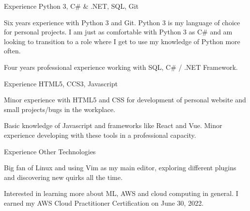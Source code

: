 \begin{cventries}
  \cventry
    {Experience}
    {Python 3, C\# \& .NET, SQL, Git}
    {}
    {}
    {
      \begin{cvitems}
		  \item Six years experience with Python 3 and Git. Python 3 is my language of choice for personal projects. I am just as comfortable with Python 3 as C\# and am looking to transition to a role where I get to use my knowledge of Python more often.
		  \item Four years professional experience working with SQL, C\# / .NET Framework.
      \end{cvitems}
    }
  \cventry
    {Experience}
    {HTML5, CCS3, Javascript}
    {}
    {}
    {
      \begin{cvitems}
	      \item Minor experience with HTML5 and CSS for development of personal website and small projects/bugs in the workplace.
		  \item Basic knowledge of Javascript and frameworks like React and Vue. Minor experience developing with these tools in a professional capacity.
      \end{cvitems}
    }
  \cventry
    {Experience}
    {Other Technologies}
    {}
    {}
    {
      \begin{cvitems}
	      \item Big fan of Linux and using Vim as my main editor, exploring different plugins and discovering new quirks all the time.
		  \item Interested in learning more about ML, AWS and cloud computing in general. I earned my AWS Cloud Practitioner Certification on June 30, 2022.
      \end{cvitems}
    }
\vspace*{-4pt}
\end{cventries}

